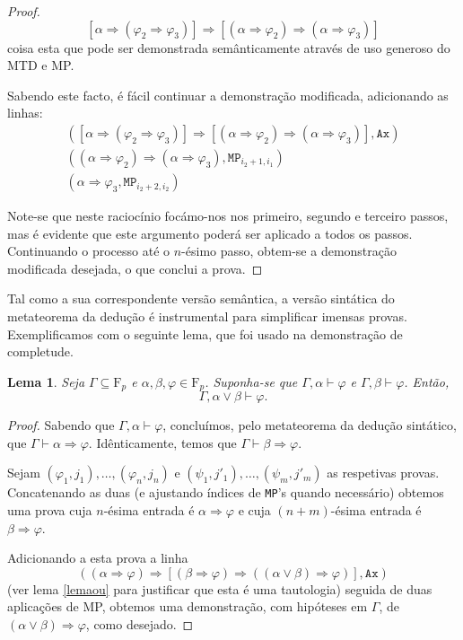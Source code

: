 \documentclass{report}
\newtheorem{lema}{Lema}
\theoremstyle{definition}
\theoremstyle{remark}
\newcommand{\F}{\mathrm{F}}
\newcommand{\imply}{\mathbin{\Rightarrow}}
\begin{document}
\begin{proof}
	\[[\alpha \imply (\varphi_2 \imply \varphi_3)] \imply [(\alpha \imply \varphi_2) \imply (\alpha \imply \varphi_3)]\]
	coisa esta que pode ser demonstrada semânticamente através de uso generoso do MTD e MP.
	
	Sabendo este facto, é fácil continuar a demonstração modificada, adicionando as linhas:
	\begin{gather*}
	([\alpha \imply (\varphi_2 \imply \varphi_3)] \imply [(\alpha \imply \varphi_2) \imply (\alpha \imply \varphi_3)], \texttt{Ax})\\
	((\alpha \imply \varphi_2) \imply (\alpha \imply \varphi_3), \texttt{MP}_{i_2 + 1, i_1})\\
	(\alpha \imply \varphi_3, \texttt{MP}_{i_2 + 2, i_2})
	\end{gather*}
	
	Note-se que neste raciocínio focámo-nos nos primeiro, segundo e terceiro passos, mas é evidente que este argumento poderá ser aplicado a todos os passos. Continuando o processo até o $n$-ésimo passo, obtem-se a demonstração modificada desejada, o que conclui a prova.
	\end{proof}
	
	Tal como a sua correspondente versão semântica, a versão sintática do metateorema da dedução é instrumental para simplificar imensas provas. Exemplificamos com o seguinte lema, que foi usado na demonstração de completude.
	
	\begin{lema}\label{lema:1}
	Seja $\Gamma \subseteq \F_p$ e $\alpha, \beta, \varphi \in \F_p$. Suponha-se que $\Gamma, \alpha \vdash \varphi$ e $\Gamma, \beta \vdash \varphi$. Então,
	\[\Gamma, \alpha \lor \beta \vdash \varphi.\]
	\end{lema}
	
	\begin{proof}
	Sabendo que $\Gamma, \alpha \vdash \varphi$, concluímos, pelo metateorema da dedução sintático, que $\Gamma \vdash \alpha \imply \varphi$. Idênticamente, temos que $\Gamma \vdash \beta \imply \varphi$.
	
	Sejam $(\varphi_1, j_1), \dots, (\varphi_n, j_n)$ e $(\psi_1, j'_1), \dots, (\psi_m, j'_m)$ as respetivas provas. Concatenando as duas (e ajustando índices de \texttt{MP}'s quando necessário) obtemos uma prova cuja $n$-ésima entrada é $\alpha \imply \varphi$ e cuja $(n+m)$-ésima entrada é $\beta \imply \varphi$.
	
	Adicionando a esta prova a linha
	\[((\alpha \imply \varphi) \imply [(\beta \imply \varphi) \imply ((\alpha \lor \beta) \imply \varphi)], \texttt{Ax})\]
	(ver lema \ref{lemaou} para justificar que esta é uma tautologia) seguida de duas aplicações de MP, obtemos uma demonstração, com hipóteses em $\Gamma$, de $(\alpha \lor \beta) \imply \varphi$, como desejado.
	\end{proof}
	
\end{document}
